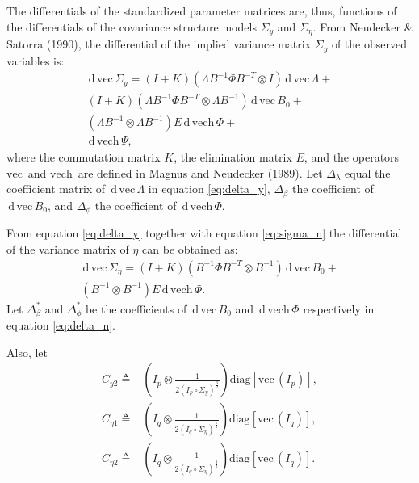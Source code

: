 \documentclass{article}
\newcommand{\n}{\eta}
\renewcommand{\l}{\lambda}
\renewcommand{\b}{\beta}
\newcommand{\p}{\phi}
\renewcommand{\d}{\,\mathrm{d}\,}
\newcommand{\definedas}{\triangleq}
\newcommand{\kronprod}{\otimes}
\newcommand{\hadaprod}{\circ}
\newcommand{\diag}{\mathrm{diag}}
\renewcommand{\vec}{\mathrm{vec}\,}
\newcommand{\vech}{\mathrm{vech}\,}
\begin{document}
The differentials of the standardized parameter matrices are, thus, 
functions of the differentials of the covariance structure models $\Sigma_y$ and
$\Sigma_\n$.
From Neudecker \& Satorra (1990), the differential of the implied variance
matrix $\Sigma_y$ of the observed variables is:
\begin{equation}\label{eq:delta_y}
\begin{split}
\d\vec \Sigma_y = (I + K) (\Lambda B^{-1} \Phi B^{-T} \kronprod I) 
\d\vec\Lambda 
+ \\
(I + K) (\Lambda B^{-1} \Phi B^{-T} \kronprod \Lambda B^{-1}) \d\vec B_0
+ \\
(\Lambda B^{-1} \kronprod \Lambda B^{-1}) E \d \vech \Phi
+ \\
\d \vech \Psi,
\end{split}
\end{equation}
where the commutation matrix $K$, the elimination matrix $E$, and the operators
$\vec$ and $\vech$ are defined in Magnus and Neudecker (1989).
Let $\Delta_\l$ equal the coefficient matrix
 of $\d\vec\Lambda$ in equation \ref{eq:delta_y}, 
$\Delta_\b$ the coefficient  of $\d\vec B_0$, and
$\Delta_\p$ the coefficient  of $\d\vech\Phi$.


From equation \ref{eq:delta_y} together with equation \ref{eq:sigma_n} the
differential of the variance matrix of $\n$ can be obtained as:
\begin{equation}\label{eq:delta_n}
\begin{split}
\d\vec \Sigma_\n = 
(I + K) (B^{-1} \Phi B^{-T} \kronprod  B^{-1}) \d\vec B_0
+ \\
(B^{-1} \kronprod  B^{-1}) E \d \vech \Phi.
\end{split}
\end{equation}
Let $\Delta^*_\b$ and $\Delta^*_\p$  be the coefficients of $\d\vec B_0$ and
$\d\vech\Phi$ respectively in equation \ref{eq:delta_n}.

Also, let
\begin{align}
    C_{y2} \definedas&
        (I_p \kronprod \frac{1}{2 (I_p \hadaprod \Sigma_y)^{\frac{3}{2}}})
        \diag[\vec(I_p)],
\\
    C_{\n1} \definedas&
        (I_q \kronprod \frac{1}{2 (I_q \hadaprod \Sigma_\n)^{\frac{1}{2}}})
        \diag[\vec(I_q)],
\\
    C_{\n2} \definedas&
        (I_q \kronprod \frac{1}{2 (I_q \hadaprod \Sigma_\n)^{\frac{3}{2}}})
        \diag[\vec(I_q)].
\end{align}
\end{document}
